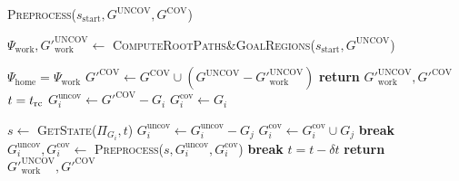 \begin{algorithm}
\caption{\textsc{Preprocess}($s_{\textrm{start}},G^{\textrm{UNCOV}},G^{\textrm{COV}}$)}\label{alg:2}
\begin{algorithmic}[1]
\State $\Psi_{\textrm{work}}, G'^{\textrm{UNCOV}}_{\textrm{work}} \leftarrow$ \textsc{ComputeRootPaths\&GoalRegions}($s_{\textrm{start}},G^{\textrm{UNCOV}}$)

    \State $\Psi_{\textrm{home}} = \Psi_{\textrm{work}}$
\EndIf
\State $G'^{\textrm{COV}} \leftarrow G^{\textrm{COV}} \cup (G^{\textrm{UNCOV}} - G'^{\textrm{UNCOV}}_{\textrm{work}})$
    \State \textbf{return} $G'^{\textrm{UNCOV}}_{\textrm{work}}, G'^{\textrm{COV}}$
\EndIf
{}
    \State $t = t_{\textrm{rc}}$
    \State $G_i^{\textrm{uncov}} \leftarrow G'^{\textrm{COV}} - G_i$
    \State $G_i^{\textrm{cov}} \leftarrow G_i$

    
        \State $s \leftarrow$ \textsc{GetState($\Pi_{G_i}, t$)}
                \State $G_i^{\textrm{uncov}} \leftarrow G_i^{\textrm{uncov}} - G_j$
                \State $G_i^{\textrm{cov}} \leftarrow G_i^{\textrm{cov}} \cup G_j$
            \EndIf
        \EndFor
            \State \textbf{break}
        \EndIf
        \State $G_i^{\textrm{uncov}},G_i^{\textrm{cov}} \leftarrow$ \textsc{Preprocess}($s,G_i^{\textrm{uncov}},G_i^{\textrm{cov}}$)
            \State \textbf{break}
        \EndIf
        \State $t = t - \delta t$
    \EndWhile
\EndFor
\State \textbf{return} $G'^{\textrm{UNCOV}}_{\textrm{work}}, G'^{\textrm{COV}}$

\end{algorithmic}
\end{algorithm}

